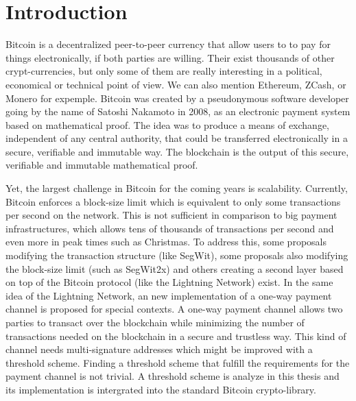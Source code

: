 \chapter{Introduction}
\label{chap:introduction}

Bitcoin is a decentralized peer-to-peer currency that allow users to to pay for
things electronically, if both parties are willing. Their exist thousands of other
crypt-currencies, but only some of them are really interesting in a political,
economical or technical point of view. We can also mention Ethereum, ZCash, or Monero
for expemple.
Bitcoin was created by a pseudonymous software developer going by the name of
Satoshi Nakamoto in 2008, as an electronic payment system based on mathematical proof.
The idea was to produce a means of exchange, independent of any central authority,
that could be transferred electronically in a secure, verifiable and immutable way.
The blockchain is the output of this secure, verifiable and immutable mathematical proof.

Yet, the largest challenge in Bitcoin for the coming years is scalability. Currently, Bitcoin enforces
a block-size limit which is equivalent to only some transactions per second on the network. This
is not sufficient in comparison to big payment infrastructures, which allows tens of
thousands of transactions per second and even more in peak times such as Christmas. To address this,
some proposals modifying the transaction structure (like SegWit), some proposals also modifying the
block-size limit (such as SegWit2x) and others creating a second layer based on top of the Bitcoin
protocol (like the Lightning Network) exist. In the same idea of the Lightning Network,
an new implementation of a one-way payment channel is proposed for special contexts.
A one-way payment channel allows two parties to transact over the blockchain while
minimizing the number of transactions needed on the blockchain in a secure and trustless way.
This kind of channel needs multi-signature addresses which might be improved with a threshold scheme.
Finding a threshold scheme that fulfill the requirements for the payment channel
is not trivial. A threshold scheme is analyze in this thesis and its implementation
is intergrated into the standard Bitcoin crypto-library.

